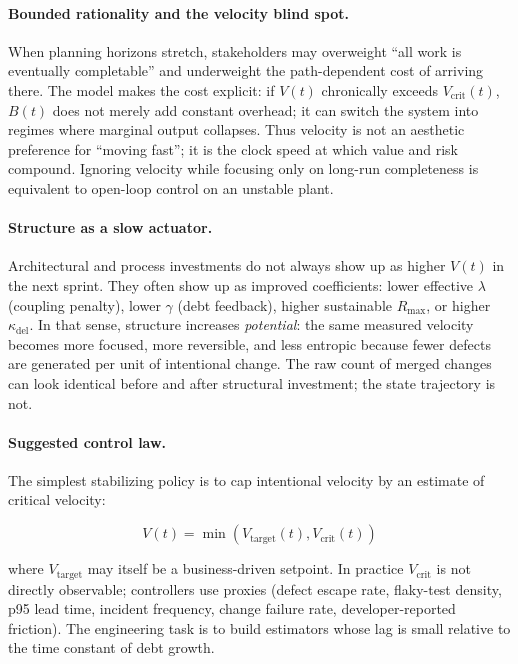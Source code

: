 \documentclass[11pt]{article}
\begin{document}
\paragraph{Bounded rationality and the velocity blind spot.}
When planning horizons stretch, stakeholders may overweight ``all work is eventually completable'' and underweight the path-dependent cost of arriving there. The model makes the cost explicit: if $V(t)$ chronically exceeds $V_{\text{crit}}(t)$, $B(t)$ does not merely add constant overhead; it can switch the system into regimes where marginal output collapses. Thus velocity is not an aesthetic preference for ``moving fast''; it is the clock speed at which value and risk compound. Ignoring velocity while focusing only on long-run completeness is equivalent to open-loop control on an unstable plant.

\paragraph{Structure as a slow actuator.}
Architectural and process investments do not always show up as higher $V(t)$ in the next sprint. They often show up as improved coefficients: lower effective $\lambda$ (coupling penalty), lower $\gamma$ (debt feedback), higher sustainable $R_{\max}$, or higher $\kappa_{\text{del}}$. In that sense, structure increases \emph{potential}: the same measured velocity becomes more focused, more reversible, and less entropic because fewer defects are generated per unit of intentional change. The raw count of merged changes can look identical before and after structural investment; the state trajectory is not.

\paragraph{Suggested control law.}
The simplest stabilizing policy is to cap intentional velocity by an estimate of critical velocity:

\begin{equation}
V(t) = \min(V_{\text{target}}(t), V_{\text{crit}}(t))
\end{equation}

where $V_{\text{target}}$ may itself be a business-driven setpoint. In practice $V_{\text{crit}}$ is not directly observable; controllers use proxies (defect escape rate, flaky-test density, p95 lead time, incident frequency, change failure rate, developer-reported friction). The engineering task is to build estimators whose lag is small relative to the time constant of debt growth.
\end{document}

